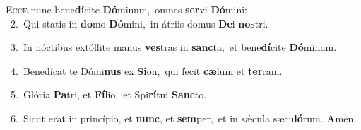 \lettrine{\initial\textcolor{\initialcolor}{E}}{cce} nunc bene\-\textbf{dí}\-cite \textbf{Dó}\-minum,~\star omnes \textbf{ser}\-vi \textbf{Dó}\-mini:\\
{\numbfont\textcolor{\numbcolor}{~2.}}~Qui statis in \textbf{do}\-mo \textbf{Dó}\-mini,~\star in átriis domus \textbf{De}\-i \textbf{nos}\-tri.\par
{\numbfont\textcolor{\numbcolor}{~3.}}~In nóctibus extóllite manus \textbf{ves}\-tras in \textbf{sanc}\-ta,~\star et bene\-\textbf{dí}\-cite \textbf{Dó}\-minum.\par
{\numbfont\textcolor{\numbcolor}{~4.}}~Benedícat te Dómi\textbf{nus} ex \textbf{Si}\-on,~\star qui fecit \textbf{cæ}\-lum et \textbf{ter}\-ram.\par
{\numbfont\textcolor{\numbcolor}{~5.}}~Glória \textbf{Pa}\-tri, et \textbf{Fí}\-lio,~\star et Spi\-\textbf{rí}\-tui \textbf{Sanc}\-to.\par
{\numbfont\textcolor{\numbcolor}{~6.}}~Sicut erat in princípio, et \textbf{nunc}\-, et \textbf{sem}\-per,~\star et in sǽcula sæcu\-\textbf{ló}\-rum. \textbf{A}\-men.\par
